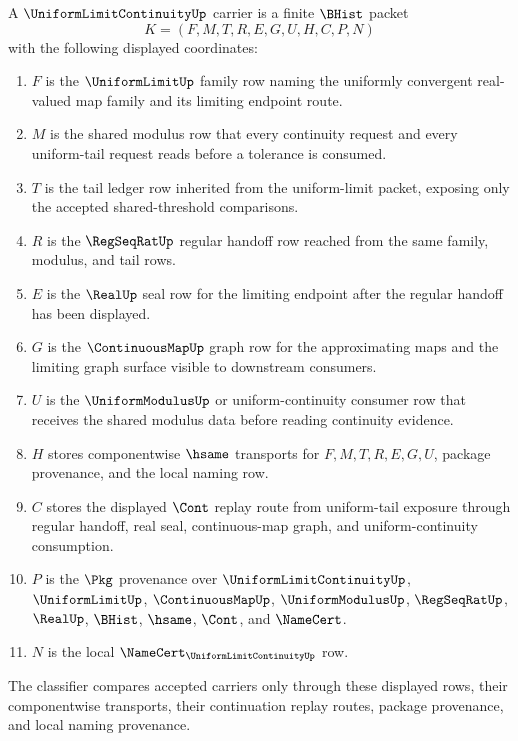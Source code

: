 \begin{definition}
\label{def:uniform-limit-continuity-carrier}
A $\UniformLimitContinuityUp$ carrier is a finite $\BHist$ packet
$$
K=(F,M,T,R,E,G,U,H,C,P,N)
$$
with the following displayed coordinates:
\begin{enumerate}
\item $F$ is the $\UniformLimitUp$ family row naming the uniformly convergent real-valued map family and its limiting endpoint route.
\item $M$ is the shared modulus row that every continuity request and every uniform-tail request reads before a tolerance is consumed.
\item $T$ is the tail ledger row inherited from the uniform-limit packet, exposing only the accepted shared-threshold comparisons.
\item $R$ is the $\RegSeqRatUp$ regular handoff row reached from the same family, modulus, and tail rows.
\item $E$ is the $\RealUp$ seal row for the limiting endpoint after the regular handoff has been displayed.
\item $G$ is the $\ContinuousMapUp$ graph row for the approximating maps and the limiting graph surface visible to downstream consumers.
\item $U$ is the $\UniformModulusUp$ or uniform-continuity consumer row that receives the shared modulus data before reading continuity evidence.
\item $H$ stores componentwise $\hsame$ transports for $F,M,T,R,E,G,U$, package provenance, and the local naming row.
\item $C$ stores the displayed $\Cont$ replay route from uniform-tail exposure through regular handoff, real seal, continuous-map graph, and uniform-continuity consumption.
\item $P$ is the $\Pkg$ provenance over $\UniformLimitContinuityUp$, $\UniformLimitUp$, $\ContinuousMapUp$, $\UniformModulusUp$, $\RegSeqRatUp$, $\RealUp$, $\BHist$, $\hsame$, $\Cont$, and $\NameCert$.
\item $N$ is the local $\NameCert_{\UniformLimitContinuityUp}$ row.
\end{enumerate}
The classifier compares accepted carriers only through these displayed rows, their componentwise transports, their continuation replay routes, package provenance, and local naming provenance.
\end{definition}

